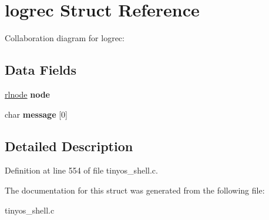 \hypertarget{structlogrec}{}\section{logrec Struct Reference}
\label{structlogrec}


Collaboration diagram for logrec\+:
\subsection*{Data Fields}
\begin{DoxyCompactItemize}
\item 
\mbox{\label{structlogrec_ab1f7006e72b67ba7b9d0b26713997aa5}} 
\hyperlink{group__rlists_ga8f6244877f7ce2322c90525217ea6e7a}{rlnode} {\bfseries node}
\item 
\mbox{\label{structlogrec_ad21f53e0393fccb77219c1d9d94b7d23}} 
char {\bfseries message} \mbox{[}0\mbox{]}
\end{DoxyCompactItemize}


\subsection{Detailed Description}


Definition at line 554 of file tinyos\+\_\+shell.\+c.



The documentation for this struct was generated from the following file\+:\begin{DoxyCompactItemize}
\item 
tinyos\+\_\+shell.\+c\end{DoxyCompactItemize}
